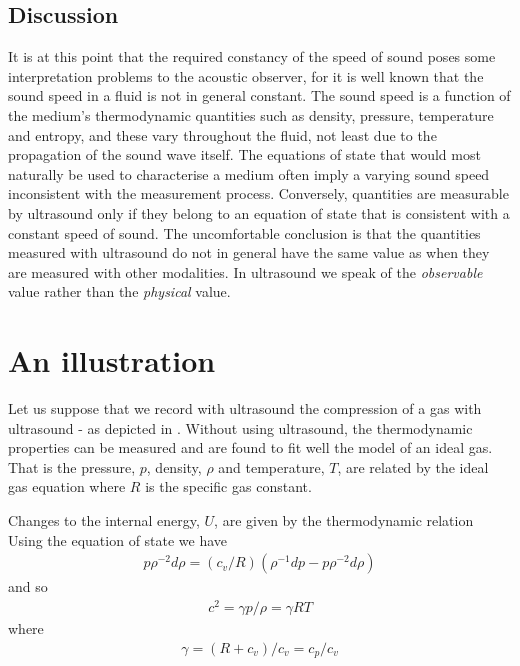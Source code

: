 \subsection{Discussion}

It is at this point that the required constancy of the speed of sound poses some interpretation problems to the acoustic observer,
for it is well known that the sound speed in a fluid is not in general constant.
The sound speed is a function of the medium's thermodynamic quantities such as  density, pressure, temperature and entropy,
and these vary throughout the fluid, not least due to the propagation of the sound wave itself.
The equations of state that would most naturally be used to characterise a medium often imply a varying sound speed inconsistent with the measurement process.
Conversely, quantities are measurable by ultrasound only if they belong to an equation of state that is consistent with a constant speed of sound.
The uncomfortable conclusion is that the quantities measured with ultrasound do not in general have the same value as when they are measured with other modalities.
In ultrasound we speak of the  {\em observable} value rather than the {\em physical} value.

\section{An illustration}

Let us suppose that we record with ultrasound the compression of a gas with ultrasound - as depicted in .
Without using ultrasound, the thermodynamic properties can be measured and are found to fit well the model of an ideal gas.
That is the pressure, $p$, density, $\rho$ and temperature, $T$, are related by the ideal gas equation
where $R$ is the specific gas constant.

Changes to the internal energy, $U$, are given by the thermodynamic relation
Using the equation of state we have
\begin{align}
 p \rho^{-2} d\rho = (c_v/R) (\rho^{-1}dp - p \rho^{-2} d\rho)
\end{align}
and so 
\begin{align}
c^2 = \gamma p/ \rho = \gamma RT
\end{align}
where 
\begin{align}
\gamma = (R + c_v)/c_v = c_p/c_v
\end{align}


